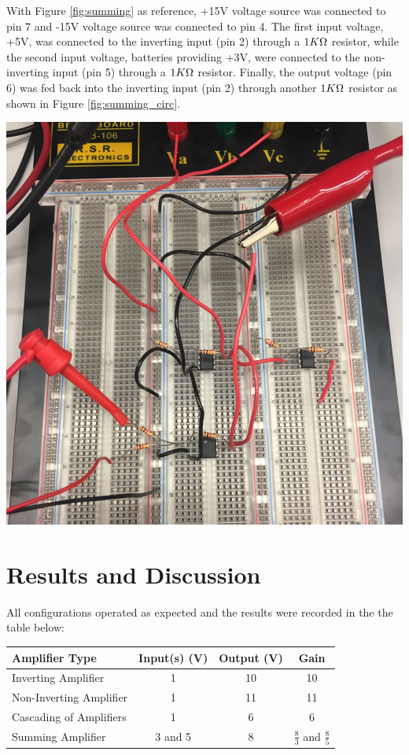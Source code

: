 \documentclass[journal]{IEEEtran}
\begin{document}
\noindent With Figure \ref{fig:summing} as reference, +15V voltage source was connected to pin 7 and -15V voltage source was connected to pin 4. The first input voltage, +5V, was connected to the inverting input (pin 2) through a $1K\ohm$ resistor, while the second input voltage, batteries providing +3V, were connected to the non-inverting input (pin 5) through a $1K\ohm$ resistor. Finally, the output voltage (pin 6) was fed back into the inverting input (pin 2) through another $1K\ohm$ resistor as shown in Figure \ref{fig:summing_circ}.

\begingroup
    \centering
    \medskip
    \includegraphics[width=\columnwidth]{images/lab7_summing_circuit.jpg}
    \label{fig:summing_circ}
    \medskip
\endgroup

\section{Results and Discussion}
\noindent All configurations operated as expected and the results were recorded in the the table below:

\begingroup
\bigskip
\centering
\def\arraystretch{1.5}
\begin{tabular}{lccc}
\toprule
Amplifier Type & Input(s) (V) & Output (V) & Gain \\
\midrule
Inverting Amplifier & 1 & 10 & 10\\
Non-Inverting Amplifier & 1 & 11 & 11\\
Cascading of Amplifiers & 1 & 6 & 6\\
Summing Amplifier & 3 and 5 & 8 & $\frac{8}{3}$ and $\frac{8}{5}$
\bottomrule
\end{tabular}
\label{fig:table}
    \medskip
\endgroup
\end{document}
